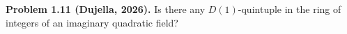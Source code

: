 \textbf{Problem 1.11 (Dujella, 2026).} Is there any $D(1)$-quintuple in the ring of integers of an imaginary quadratic field?
